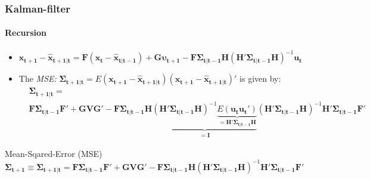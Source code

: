 \documentclass{beamer} %
\begin{document}
\begin{frame}\frametitle{Kalman-filter}\framesubtitle{Recursion}
\begin{itemize}
\item $\mathbf{x_{t+1}} - \mathbf{\widehat{x}_{t+1|t}} = \mathbf{F}\left(\mathbf{x_{t}} - \mathbf{\widehat{x}_{t|t-1}}\right) + \mathbf{G} \boldsymbol{\upsilon_{t+1}} - \mathbf{F}\boldsymbol{\Sigma_{t|t-1}} \mathbf{H} \left(\mathbf{H}'\boldsymbol{\Sigma_{t|t-1}}\mathbf{H}\right)^{-1} \mathbf{u_t}$
\item The \emph{MSE: } $\boldsymbol{\Sigma_{t+1|t} }= E\left(\mathbf{x_{t+1}} - \mathbf{\widehat{x}_{t+1|t}}\right)\left(\mathbf{x_{t+1}} - \mathbf{\widehat{x}_{t+1|t}}\right)'$ is given by:
\scriptsize\begin{align*}
    &\boldsymbol{\Sigma_{t+1|t} }=\\
    & \mathbf{F} \boldsymbol{\Sigma_{t|t-1}} \mathbf{F'} + \mathbf{G} \mathbf{V} \mathbf{G}' - \mathbf{F}\boldsymbol{\Sigma_{t|t-1}} \mathbf{H} \underbrace{\left(\mathbf{H}'\boldsymbol{\Sigma_{t|t-1}}\mathbf{H}\right)^{-1} \underbrace{E(\mathbf{u_t} \mathbf{u_t'})}_{=\mathbf{H'} \boldsymbol{\Sigma_{t|t-1}} \mathbf{H}}}_{=\mathbf{I}}
    \left(\mathbf{H}'\boldsymbol{\Sigma_{t|t-1}}\mathbf{H}\right)^{-1} \mathbf{H}' \boldsymbol{\Sigma_{t|t-1}} \mathbf{F}'
\end{align*}
\end{itemize}
\scriptsize\begin{block}{Mean-Sqared-Error (MSE)}\centering
$
\boldsymbol{\Sigma_{t+1} } \equiv \boldsymbol{\Sigma_{t+1|t} }      = \mathbf{F} \boldsymbol{\Sigma_{t|t-1}} \mathbf{F'} + \mathbf{G} \mathbf{V} \mathbf{G}' - \mathbf{F}\boldsymbol{\Sigma_{t|t-1}} \mathbf{H} \left(\mathbf{H}'\boldsymbol{\Sigma_{t|t-1}}\mathbf{H}\right)^{-1} \mathbf{H}' \boldsymbol{\Sigma_{t|t-1}}\mathbf{F}'
$
\end{block}
\end{frame}
\end{document}
